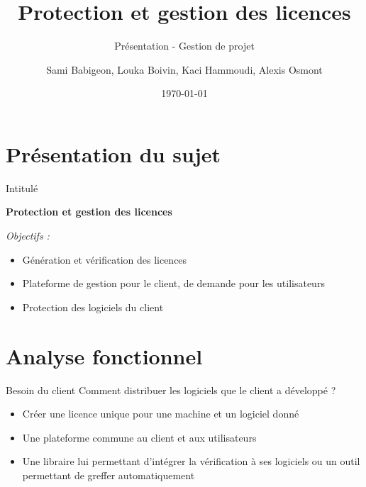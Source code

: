 \documentclass{cubeamer}
\title{Protection et gestion des licences}
\subtitle{Présentation - Gestion de projet}
\author{Sami Babigeon, Louka Boivin, Kaci Hammoudi, Alexis Osmont}
\date{\today}
\institute[Université de Rouen]{Master Informatique - 1ère année}
\begin{document}
\maketitle

\cutoc

%
%

\section{Présentation du sujet}

\begin{frame}{Intitulé}
    \centerline{\textbf{Protection et gestion des licences}}
    \medskip
    \emph{Objectifs :}
    \begin{itemize}
        \item Génération et vérification des licences
        \item Plateforme de gestion pour le client, de demande pour les utilisateurs
        \item Protection des logiciels du client
    \end{itemize}
\end{frame}

\section{Analyse fonctionnel}

\begin{frame}{Besoin du client}
    Comment distribuer les logiciels que le client a développé ?
    \begin{itemize}
        \item Créer une licence unique pour une machine et un logiciel donné
        \item Une plateforme commune au client et aux utilisateurs
        \item Une libraire lui permettant d'intégrer la vérification à ses logiciels ou
            un outil permettant de greffer automatiquement
    \end{itemize}
\end{frame}
\end{document}
